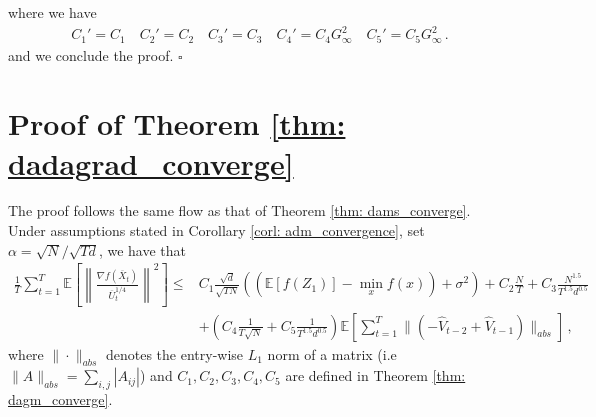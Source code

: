 \documentclass[anon,12pt]{colt2021} %
\begin{document}
where we have 
\begin{align}
C_1' = C_1 \quad C_2' = C_2 \quad C_3' = C_3 \quad C_4' = C_4G_{\infty}^2 \quad C_5' = C_5 G_{\infty}^2 \, .
\end{align}
and we conclude the proof. \hfill $\square$



\clearpage


\section{Proof of Theorem \ref{thm: dadagrad_converge}} \label{app: proof_adagrad}

The proof follows the same flow as that of Theorem \ref{thm: dams_converge}. Under assumptions stated in Corollary \ref{corl: adm_convergence}, set $\alpha = \sqrt{N}/\sqrt{Td}$, we have that
\begin{align}\label{eq: rep_thm1bis}
	 \frac{1}{T}\sum_{t=1}^T  \mathbb E \left [\left\|\frac{\nabla f( \overline X_{t})}{\overline U_{t}^{1/4}}\right\|^2  \right] 
	\leq  & C_1 \frac{\sqrt{d}}{\sqrt{TN}} \left(( \mathbb E  [f( Z_{1})]  -  \min_x  f(x)) +    \sigma^2 \right)  +  C_2 \frac{N}{T}  +  C_3 \frac{N^{1.5}}{T^{1.5}d^{0.5}} 
	\nonumber \\
    &+  \left(C_4 \frac{1}{T\sqrt{N}} +  C_5   \frac{1}{T^{1.5}d^{0.5}}\right) 
\mathbb E \left[ \sum_{t=1}^{T}   \|    (- \hat V_{t-2} + \hat V_{t-1} ) \|_{abs} \right]  \, ,
\end{align}
where $\| \cdot\|_{abs}$  denotes the entry-wise $L_1$ norm of a matrix (i.e $\| A\|_{abs} = \sum_{i,j}{|A_{ij}|}$) and $C_1, C_2 ,C_3, C_4, C_5$ are defined in Theorem \ref{thm: dagm_converge}. 
\end{document}
